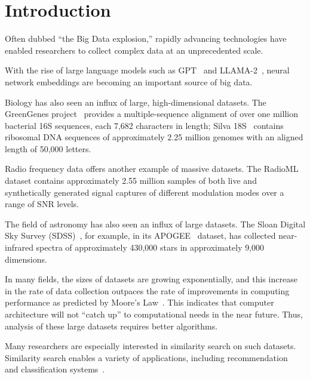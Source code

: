 \section{Introduction}
\label{sec:introduction}

Often dubbed ``the Big Data explosion,'' rapidly advancing technologies have enabled researchers to collect complex data at an unprecedented scale. 

With the rise of large language models such as GPT~\cite{2020arXiv200514165B, OpenAI2023GPT4TR} and LLAMA-2~\cite{Touvron2023Llama2O}, neural network embeddings are becoming an important source of big data.

Biology has also seen an influx of large, high-dimensional datasets.
The GreenGenes project~\cite{desantis2006greengenes} provides a multiple-sequence alignment of over one million bacterial 16S sequences, each 7,682 characters in length;
Silva 18S~\cite{10.1093/nar/gks1219} contains ribosomal DNA sequences of approximately 2.25 million genomes with an aligned length of 50,000 letters.

Radio frequency data offers another example of massive datasets. 
The RadioML~\cite{oshea2018radioml} dataset contains approximately 2.55 million samples of both live and synthetically generated signal captures of different modulation modes over a range of SNR levels.

The field of astronomy has also seen an influx of large datasets.
The Sloan Digital Sky Survey (SDSS)~\cite{blanton2017sdss}, for example, in its APOGEE~\cite{alam2015eleventh} dataset, has collected near-infrared spectra of approximately 430,000 stars in approximately 9,000 dimensions. 

In many fields, the sizes of datasets are growing exponentially, and this increase in the rate of data collection outpaces the rate of improvements in computing performance as predicted by Moore's Law~\cite{brescia2012extracting}.
This indicates that computer architecture will not ``catch up'' to computational needs in the near future.
Thus, analysis of these large datasets requires better algorithms.

Many researchers are especially interested in similarity search on such datasets. 
Similarity search enables a variety of applications, including recommendation~\cite{annoy} and classification systems~\cite{suyanto2022knnclassifier}. 


